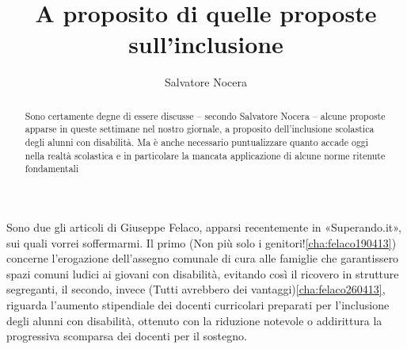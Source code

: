 \author{Salvatore Nocera}
\title{A proposito di quelle proposte sull'inclusione }
\label{nocera020513}
\begin{abstract}
Sono certamente degne di essere discusse – secondo Salvatore Nocera – alcune proposte apparse in queste settimane nel nostro giornale, a proposito dell'inclusione scolastica degli alunni con disabilità. Ma è anche necessario puntualizzare quanto accade oggi nella realtà scolastica e in particolare la mancata applicazione di alcune norme ritenute fondamentali
\end{abstract}
\maketitle
 Sono due gli articoli di Giuseppe Felaco, apparsi recentemente in «Superando.it», sui quali vorrei soffermarmi. Il primo (Non più solo i genitori!\ref{cha:felaco190413}) concerne l'erogazione dell'assegno comunale di cura alle famiglie che garantissero spazi comuni ludici ai giovani con disabilità, evitando così il ricovero in strutture segreganti, il secondo, invece (Tutti avrebbero dei vantaggi)\ref{cha:felaco260413}, riguarda l'aumento stipendiale dei docenti curricolari preparati per l'inclusione degli alunni con disabilità, ottenuto con la riduzione notevole o addirittura la progressiva scomparsa dei docenti per il sostegno.

